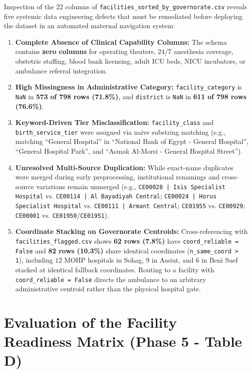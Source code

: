 \documentclass[10pt,a4paper]{article}
\begin{document}
Inspection of the $22$ columns of \texttt{facilities\_sorted\_by\_governorate.csv} reveals five systemic data engineering defects that must be remediated before deploying the dataset in an automated maternal navigation system:
\begin{enumerate}
    \item \textbf{Complete Absence of Clinical Capability Columns:} The schema contains \textbf{zero columns} for operating theaters, 24/7 anesthesia coverage, obstetric staffing, blood bank licensing, adult ICU beds, NICU incubators, or ambulance referral integration.
    \item \textbf{High Missingness in Administrative Category:} \texttt{facility\_category} is \texttt{NaN} in \textbf{573 of 798 rows (71.8\%)}, and \texttt{district} is \texttt{NaN} in \textbf{611 of 798 rows (76.6\%)}.
    \item \textbf{Keyword-Driven Tier Misclassification:} \texttt{facility\_class} and \texttt{birth\_service\_tier} were assigned via naive substring matching (e.g., matching ``General Hospital'' in ``National Bank of Egypt - General Hospital'', ``General Hospital Park'', and ``Asmak Al-Morsi - General Hospital Street'').
    \item \textbf{Unresolved Multi-Source Duplication:} While exact-name duplicates were merged during early preprocessing, institutional renamings and cross-source variations remain unmerged (e.g., \texttt{CE00028 | Isis Specialist Hospital} vs. \texttt{CE00114 | Al Bayadiyah Central}; \texttt{CE00024 | Horus Specialist Hospital} vs. \texttt{CE00111 | Armant Central}; \texttt{CE01955} vs. \texttt{CE00929}; \texttt{CE00001} vs. \texttt{CE01950}/\texttt{CE01951}).
    \item \textbf{Coordinate Stacking on Governorate Centroids:} Cross-referencing with \texttt{facilities\_flagged.csv} shows \textbf{62 rows (7.8\%)} have \texttt{coord\_reliable = False} and \textbf{82 rows (10.3\%)} share identical coordinates (\texttt{n\_same\_coord > 1}), including $12$ MOHP hospitals in Sohag, $9$ in Assiut, and $6$ in Beni Suef stacked at identical fallback coordinates. Routing to a facility with \texttt{coord\_reliable = False} directs the ambulance to an arbitrary administrative centroid rather than the physical hospital gate.
\end{enumerate}

\section{Evaluation of the Facility Readiness Matrix (Phase 5 - Table D)}
\end{document}
